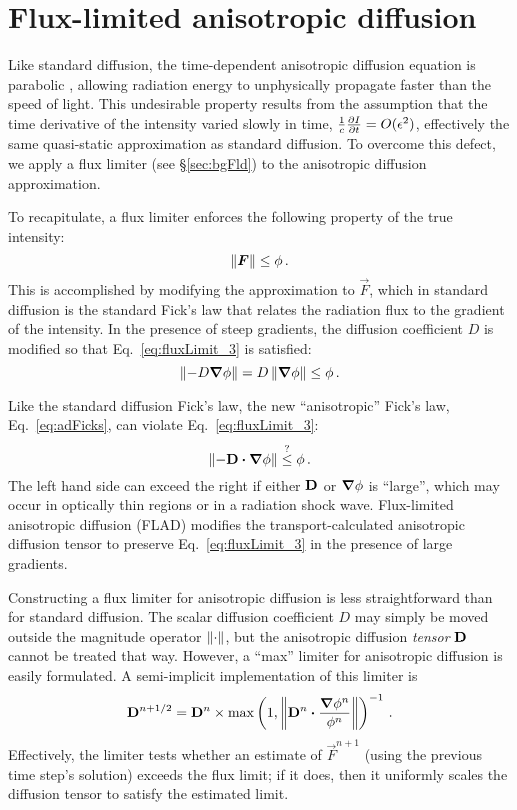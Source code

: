 \section{Flux-limited anisotropic diffusion}\label{sec:flad}

Like standard diffusion, the time-dependent anisotropic diffusion equation
is parabolic \cite{Pom1982,Ols2000}, allowing radiation energy to unphysically
propagate faster than the speed of light.  This undesirable property results
from the assumption that the time derivative of the intensity varied slowly in
time, $\frac{1}{c}\frac{\partial I}{\partial t} = O(\epsilon^2)$, effectively the same
quasi-static approximation as standard diffusion. To overcome this defect, we
apply a flux limiter (see \S\ref{sec:bgFld}) to the anisotropic diffusion
approximation.

To recapitulate, a flux limiter enforces the following property
of the true intensity:
\begin{equation}\label{eq:fluxLimit_3}
  \left\| \bm{F} \right\| \le \phi\,.
\end{equation}
This is accomplished by modifying the approximation to $\vec{F}$, which in
standard diffusion is the standard Fick's law that relates the radiation flux to
the gradient of the intensity. In the presence of steep gradients, the diffusion
coefficient $D$ is modified so that Eq.~\eqref{eq:fluxLimit_3} is satisfied:
\begin{equation*}
  \left\| - D \bm{\nabla} \phi \right\| = D \left\| \bm{\nabla} \phi \right\| \le \phi \,.
\end{equation*}

Like the standard diffusion Fick's law, the new ``anisotropic'' Fick's law,
Eq.~\eqref{eq:adFicks}, can violate Eq.~\eqref{eq:fluxLimit_3}:
\begin{equation*}
  \left\| - \mathbf{D} \bm{\cdot} \bm{\nabla} \phi \right\| \stackrel{?}{\le} \phi \,.
\end{equation*}
The left hand side can exceed the right if either $\mathbf{D}$ or $\bm{\nabla} \phi$ is
``large'', which may occur in optically thin regions or in a radiation shock
wave.
Flux-limited anisotropic diffusion (FLAD) modifies the
transport-calculated anisotropic diffusion tensor to preserve
Eq.~\eqref{eq:fluxLimit_3} in the presence of large gradients.

Constructing a flux limiter for anisotropic diffusion is less straightforward
than for standard diffusion. The scalar diffusion coefficient $D$ may
simply be moved outside the magnitude operator $\left\| \cdot \right\|$, but the
anisotropic diffusion
\emph{tensor} $\mathbf{D}$ cannot be treated that way.
However, a ``max'' limiter for anisotropic diffusion is easily formulated.
A semi-implicit implementation of this limiter is
\begin{equation}\label{eq:flad}
  \mathbf{D}^{n+1/2} = \mathbf{D}^{n} \times 
  \max\left( 1, \left\| \mathbf{D}^{n}\bm{\cdot} \frac{\bm{\nabla} \phi^{n}}{\phi^{n}} \right\|
  \right)^{-1} \,.
\end{equation}
Effectively, the limiter tests whether an estimate of $\vec{F}^{n+1}$ (using the
previous time step's solution) exceeds the flux limit; if it does, then it
uniformly scales the diffusion tensor to satisfy the estimated limit.

